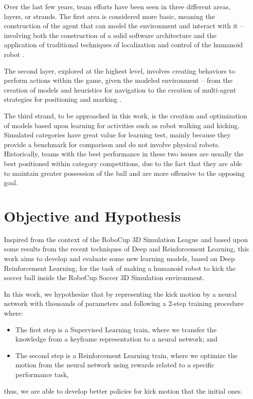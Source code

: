 Over the last few years, team efforts have been seen in three different areas, layers, or strands. The first area is considered more basic, meaning the construction of the agent that can model the environment and interact with it -- involving both the construction of a solid software architecture and the application of traditional techniques of localization and control of the humanoid robot \cite{AI1110-macalpine}.

The second layer, explored at the highest level, involves creating behaviors to perform actions within the game, given the modeled environment -- from the creation of models and heuristics for navigation to the creation of multi-agent strategies for positioning and marking \cite{LNAI16-MacAlpine}.

The third strand, to be approached in this work, is the creation and optimization of models based upon learning for activities such as robot walking and kicking. Simulated categories have great value for learning test, mainly because they provide a benchmark for comparison and do not involve physical robots. Historically, teams with the best performance in these two issues are usually the best positioned within category competitions, due to the fact that they are able to maintain greater possession of the ball and are more offensive to the opposing goal.

\section{Objective and Hypothesis}

Inspired from the context of the RoboCup 3D Simulation League and based upon some results from the recent techniques of Deep and Reinforcement Learning, this work aims to develop and evaluate some new learning models, based on Deep Reinforcement Learning, for the task of making a humanoid robot to kick the soccer ball inside the RoboCup Soccer 3D Simulation environment.

In this work, we hypothesize that by representing the kick motion by a neural network with thousands of parameters and following a 2-step training procedure where:

\begin{itemize}
	\item The first step is a Supervised Learning train, where we transfer the knowledge from a keyframe representation to a neural network; and
	\item The second step is a Reinforcement Learning train, where we optimize the motion from the neural network using rewards related to a specific performance task,
\end{itemize}
thus, we are able to develop better policies for kick motion that the initial ones.

